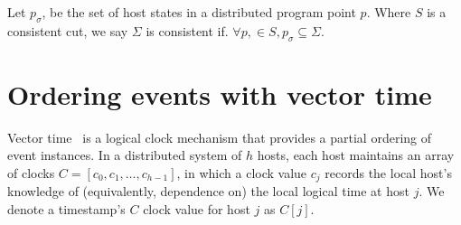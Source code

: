 
\begin{definition}
    \label{def:consistent_distributed_state}Let $p_{\sigma}$, be the set of
    host states in a distributed program point $p$. Where $S$ is a
    consistent cut,  we say $\Sigma$ is consistent if.
    $\forall p, \in S, p_{\sigma} \subseteq \Sigma$.
\end{definition}




\section{Ordering events with vector time}
\label{sec:formal-vector-clocks}


Vector time~\cite{fidge_vector_clocks_1988,
  mattern_vector_clocks_1989} is a logical clock mechanism that
provides a partial ordering of event instances. In a distributed
system of $h$ hosts, each host maintains an array of clocks $C = [c_0,
  c_1, \dots, c_{h-1}]$, in which a clock value $c_j$ records the
local host's knowledge of (equivalently, dependence on) the local
logical time at host $j$. We denote a timestamp's $C$ clock value for
host $j$ as $C[j]$.

